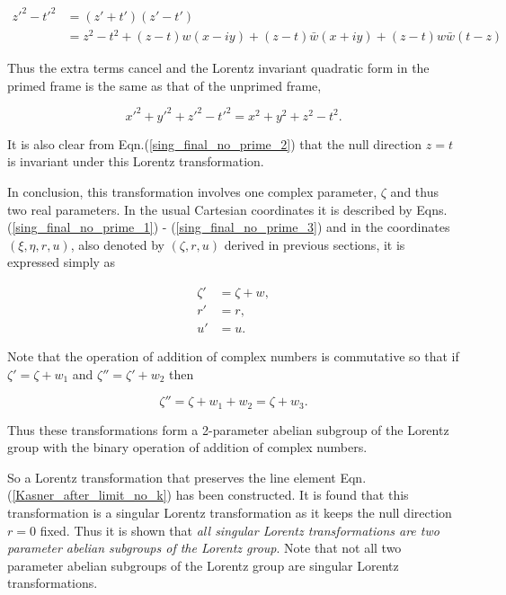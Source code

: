 \begin{align*}
{z'}^2 - {t'}^2 & = (z' + t')(z' - t') \\
& = z^2 - t^2 + (z - t)w(x-iy) + (z-t)\bar{w}(x+iy) + (z -t)w\bar{w}(t-z)
\end{align*}

\noindent Thus the extra terms cancel and the Lorentz invariant quadratic form in the primed frame is the same as that of the unprimed frame,

\begin{equation*} 
{x'}^2 + {y'}^2 + {z'}^2 - {t'}^2 = {x}^2 + {y}^2 + {z}^2 - {t}^2.
\end{equation*} 

\noindent It is also clear from Eqn.(\ref{sing_final_no_prime_2}) that the null direction $z = t$ is invariant under this Lorentz transformation.

In conclusion, this transformation involves one complex parameter, $\zeta$ and thus two real parameters. In the usual Cartesian coordinates it is described by Eqns.(\ref{sing_final_no_prime_1}) - (\ref{sing_final_no_prime_3}) and in the coordinates $(\xi, \eta, r, u)$, also denoted by $(\zeta, r,u)$ derived in previous sections, it is expressed simply as

\begin{align*}
\zeta' & = \zeta + w, \\
r' & = r, \\
u' & = u.
\end{align*}

Note that the operation of addition of complex numbers is commutative so that if $\zeta' = \zeta + w_1$ and $\zeta'' = \zeta' + w_2$ then

\begin{equation*} 
\zeta'' = \zeta + w_1 + w_2 = \zeta + w_3.
\end{equation*} 
 
\noindent Thus these transformations form a 2-parameter abelian subgroup of the Lorentz group with the binary operation of addition of complex numbers.

So a Lorentz transformation that preserves the line element Eqn.(\ref{Kasner_after_limit_no_k}) has been constructed. It is found that this transformation is a singular Lorentz transformation as it keeps the null direction $r=0$ fixed. Thus it is shown that \textit{all singular Lorentz transformations are two parameter abelian subgroups of the Lorentz group}. Note that not all two parameter abelian subgroups of the Lorentz group are singular Lorentz transformations.  






